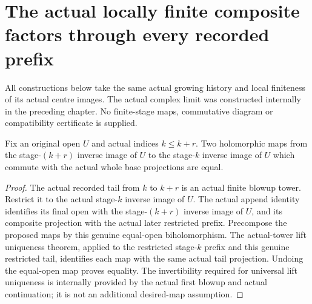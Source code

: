 \section{The actual locally finite composite factors through every recorded prefix}

All constructions below take the same actual growing history and local
finiteness of its actual centre images. The actual complex limit was
constructed internally in the preceding chapter. No finite-stage maps,
commutative diagram or compatibility certificate is supplied.

\begin{lemma}
\label{hir:actual-locally-finite-history-restricted-lift-uniqueness}
\leanok
Fix an original open $U$ and actual indices $k\leq k+r$. Two holomorphic
maps from the stage-$(k+r)$ inverse image of $U$ to the stage-$k$ inverse
image of $U$ which commute with the actual whole base projections are equal.
\end{lemma}
\begin{proof}
The actual recorded tail from $k$ to $k+r$ is an actual finite blowup tower.
Restrict it to the actual stage-$k$ inverse image of $U$. The actual append
identity identifies its final open with the stage-$(k+r)$ inverse image of
$U$, and its composite projection with the actual later restricted prefix.
Precompose the proposed maps by this genuine equal-open biholomorphism.
The actual-tower lift uniqueness theorem, applied to the restricted
stage-$k$ prefix and this genuine restricted tail, identifies each map with
the same actual tail projection. Undoing the equal-open map proves equality.
The invertibility required for universal lift uniqueness is internally
provided by the actual first blowup and actual continuation; it is not an
additional desired-map assumption.
\end{proof}

